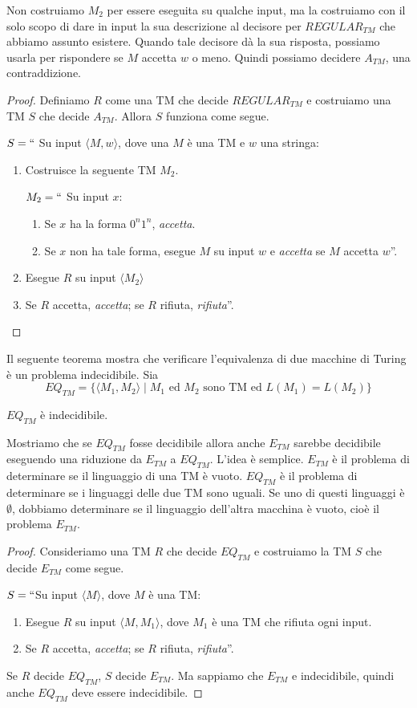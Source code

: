 \documentclass[12pt]{report}
\newcounter{theorem}
\begin{document}
Non costruiamo $M_2$ per essere eseguita su qualche input, ma la costruiamo con il solo scopo di dare in input la sua descrizione al decisore per $REGULAR_{TM}$ che abbiamo assunto esistere. Quando tale decisore dà la sua risposta, possiamo usarla per rispondere se $M$ accetta $w$ o meno. Quindi possiamo decidere $A_{TM}$, una contraddizione.
\begin{proof}
	Definiamo $R$ come una TM che decide $REGULAR_{TM}$ e costruiamo una TM $S$ che decide $A_{TM}$. Allora $S$ funziona come segue.

	$S = ``$ Su input $\langle M, w \rangle$, dove una $M$ è una TM e $w$ una stringa:
	\begin{enumerate}
		\item Costruisce la seguente TM $M_2$.

		$M_2 = ``$ Su input $x$:
		\begin{enumerate}
			\item Se $x$ ha la forma $0^n1^n$, \textit{accetta}.
			\item Se $x$ non ha tale forma, esegue $M$ su input $w$ e \textit{accetta} se $M$ accetta $w$''.
		\end{enumerate}
		\item Esegue $R$ su input $\langle M_2 \rangle$
		\item Se $R$ accetta, \textit{accetta}; se $R$ rifiuta, \textit{rifiuta}''.
	\end{enumerate}
\end{proof}
Il seguente teorema mostra che verificare l'equivalenza di due macchine di Turing è un problema indecidibile. Sia
\[
EQ_{TM} = \{\langle M_1, M_2 \rangle \mid M_1 \text{ ed }M_2 \text{ sono TM ed } L(M_1) = L(M_2)\}
\]
\begin{theorem}{}{}
	$EQ_{TM}$ è indecidibile.
\end{theorem}
Mostriamo che se $EQ_{TM}$ fosse decidibile allora anche $E_{TM}$ sarebbe decidibile eseguendo una riduzione da $E_{TM}$ a $EQ_{TM}$. L'idea è semplice. $E_{TM}$ è il problema di determinare se il linguaggio di una TM è vuoto. $EQ_{TM}$ è il problema di determinare se i linguaggi delle due TM sono uguali. Se uno di questi linguaggi è $\emptyset$, dobbiamo determinare se il linguaggio dell'altra macchina è vuoto, cioè il problema $E_{TM}$.
\begin{proof}
	Consideriamo una TM $R$ che decide $EQ_{TM}$ e costruiamo la TM $S$ che decide $E_{TM}$ come segue.

	$S = ``$Su input $\langle M \rangle$, dove $M$ è una TM:
	\begin{enumerate}
		\item Esegue $R$ su input $\langle M, M_1 \rangle $, dove $M_1$ è una TM che rifiuta ogni input.
		\item Se $R$ accetta, \textit{accetta}; se $R$ rifiuta, \textit{rifiuta}''.
	\end{enumerate}
	Se $R$ decide $EQ_{TM}$, $S$ decide $E_{TM}$. Ma sappiamo che $E_{TM}$ e indecidibile, quindi anche $EQ_{TM}$ deve essere indecidibile.
\end{proof}
\end{document}
